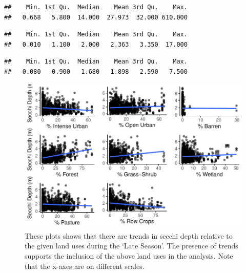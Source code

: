 \documentclass[12pt,]{article}
\begin{document}
\begin{verbatim}
##    Min. 1st Qu.  Median    Mean 3rd Qu.    Max. 
##   0.668   5.800  14.000  27.973  32.000 610.000
\end{verbatim}

\begin{verbatim}
##    Min. 1st Qu.  Median    Mean 3rd Qu.    Max. 
##   0.010   1.100   2.000   2.363   3.350  17.000
\end{verbatim}

\begin{verbatim}
##    Min. 1st Qu.  Median    Mean 3rd Qu.    Max. 
##   0.080   0.900   1.680   1.898   2.590   7.500
\end{verbatim}

\begin{figure}
\centering
\includegraphics{Bollt_Greif_Raby_Roth_Draft_1115_files/figure-latex/unnamed-chunk-5-1.pdf}
\caption{These plots shows that there are trends in secchi depth
relative to the given land uses during the `Late Season'. The presence
of trends supports the inclusion of the above land uses in the analysis.
Note that the x-axes are on different scales.}
\end{figure}
\end{document}
